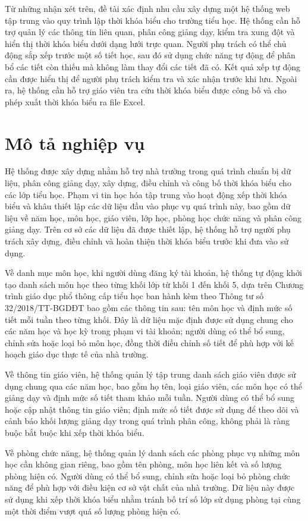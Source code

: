 \documentclass[../DoAn.tex]{subfiles}
\begin{document}
Từ những nhận xét trên, đề tài xác định nhu cầu xây dựng một hệ thống web tập trung vào quy trình lập thời khóa biểu cho trường tiểu học. Hệ thống cần hỗ trợ quản lý các thông tin liên quan, phân công giảng dạy, kiểm tra xung đột và hiển thị thời khóa biểu dưới dạng lưới trực quan. Người phụ trách có thể chủ động sắp xếp trước một số tiết học, sau đó sử dụng chức năng tự động để phân bổ các tiết còn thiếu mà không làm thay đổi các tiết đã có. Kết quả xếp tự động cần được hiển thị để người phụ trách kiểm tra và xác nhận trước khi lưu. Ngoài ra, hệ thống cần hỗ trợ giáo viên tra cứu thời khóa biểu được công bố và cho phép xuất thời khóa biểu ra file Excel.
\section{Mô tả nghiệp vụ}
\label{section:2.2}
Hệ thống được xây dựng nhằm hỗ trợ nhà trường trong quá trình chuẩn bị dữ liệu, phân công giảng dạy, xây dựng, điều chỉnh và công bố thời khóa biểu cho các lớp tiểu học. Phạm vi tin học hóa tập trung vào hoạt động xếp thời khóa biểu và khâu thiết lập các dữ liệu đầu vào phục vụ quá trình này, bao gồm dữ liệu về năm học, môn học, giáo viên, lớp học, phòng học chức năng và phân công giảng dạy. Trên cơ sở các dữ liệu đã được thiết lập, hệ thống hỗ trợ người phụ trách xây dựng, điều chỉnh và hoàn thiện thời khóa biểu trước khi đưa vào sử dụng.

Về danh mục môn học, khi người dùng đăng ký tài khoản, hệ thống tự động khởi tạo danh sách môn học theo từng khối lớp từ khối 1 đến khối 5, dựa trên Chương trình giáo dục phổ thông cấp tiểu học ban hành kèm theo Thông tư số 32/2018/TT-BGDĐT \cite{thongtu32} bao gồm các thông tin sau: tên môn học và định mức số tiết mỗi tuần theo từng khối. Đây là dữ liệu mặc định được sử dụng chung cho các năm học và học kỳ trong phạm vi tài khoản; người dùng có thể bổ sung, chỉnh sửa hoặc loại bỏ môn học, đồng thời điều chỉnh số tiết để phù hợp với kế hoạch giáo dục thực tế của nhà trường.

Về thông tin giáo viên, hệ thống quản lý tập trung danh sách giáo viên được sử dụng chung qua các năm học, bao gồm họ tên, loại giáo viên, các môn học có thể giảng dạy và định mức số tiết tham khảo mỗi tuần. Người dùng có thể bổ sung hoặc cập nhật thông tin giáo viên; định mức số tiết được sử dụng để theo dõi và cảnh báo khối lượng giảng dạy trong quá trình phân công, không phải là ràng buộc bắt buộc khi xếp thời khóa biểu.

Về phòng chức năng, hệ thống quản lý danh sách các phòng phục vụ những môn học cần không gian riêng, bao gồm tên phòng, môn học liên kết và số lượng phòng hiện có. Người dùng có thể bổ sung, chỉnh sửa hoặc loại bỏ phòng chức năng để phù hợp với điều kiện cơ sở vật chất của nhà trường. Dữ liệu này được sử dụng khi xếp thời khóa biểu nhằm tránh bố trí số lớp sử dụng phòng tại cùng một thời điểm vượt quá số lượng phòng hiện có.
\end{document}
